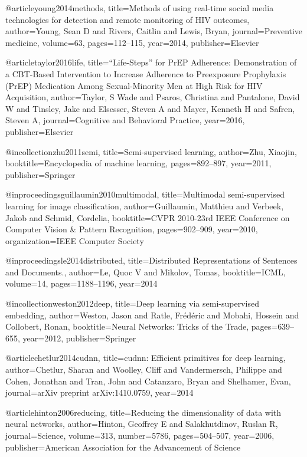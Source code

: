 @article{young2014methods,
  title={Methods of using real-time social media technologies for detection and remote monitoring of HIV outcomes},
  author={Young, Sean D and Rivers, Caitlin and Lewis, Bryan},
  journal={Preventive medicine},
  volume={63},
  pages={112--115},
  year={2014},
  publisher={Elsevier}
}

@article{taylor2016life,
  title={“Life-Steps” for PrEP Adherence: Demonstration of a CBT-Based Intervention to Increase Adherence to Preexposure Prophylaxis (PrEP) Medication Among Sexual-Minority Men at High Risk for HIV Acquisition},
  author={Taylor, S Wade and Psaros, Christina and Pantalone, David W and Tinsley, Jake and Elsesser, Steven A and Mayer, Kenneth H and Safren, Steven A},
  journal={Cognitive and Behavioral Practice},
  year={2016},
  publisher={Elsevier}
}




@incollection{zhu2011semi,
  title={Semi-supervised learning},
  author={Zhu, Xiaojin},
  booktitle={Encyclopedia of machine learning},
  pages={892--897},
  year={2011},
  publisher={Springer}
}

@inproceedings{guillaumin2010multimodal,
  title={Multimodal semi-supervised learning for image classification},
  author={Guillaumin, Matthieu and Verbeek, Jakob and Schmid, Cordelia},
  booktitle={CVPR 2010-23rd IEEE Conference on Computer Vision \& Pattern Recognition},
  pages={902--909},
  year={2010},
  organization={IEEE Computer Society}
}

@inproceedings{le2014distributed,
  title={Distributed Representations of Sentences and Documents.},
  author={Le, Quoc V and Mikolov, Tomas},
  booktitle={ICML},
  volume={14},
  pages={1188--1196},
  year={2014}
}

@incollection{weston2012deep,
  title={Deep learning via semi-supervised embedding},
  author={Weston, Jason and Ratle, Fr{\'e}d{\'e}ric and Mobahi, Hossein and Collobert, Ronan},
  booktitle={Neural Networks: Tricks of the Trade},
  pages={639--655},
  year={2012},
  publisher={Springer}
}

@article{chetlur2014cudnn,
  title={cudnn: Efficient primitives for deep learning},
  author={Chetlur, Sharan and Woolley, Cliff and Vandermersch, Philippe and Cohen, Jonathan and Tran, John and Catanzaro, Bryan and Shelhamer, Evan},
  journal={arXiv preprint arXiv:1410.0759},
  year={2014}
}

@article{hinton2006reducing,
  title={Reducing the dimensionality of data with neural networks},
  author={Hinton, Geoffrey E and Salakhutdinov, Ruslan R},
  journal={Science},
  volume={313},
  number={5786},
  pages={504--507},
  year={2006},
  publisher={American Association for the Advancement of Science}
}

